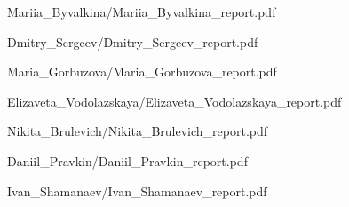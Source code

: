 \documentclass[a4paper]{article}
\begin{document}
{Mariia_Byvalkina/Mariia_Byvalkina_report.pdf}

{Dmitry_Sergeev/Dmitry_Sergeev_report.pdf}

{Maria_Gorbuzova/Maria_Gorbuzova_report.pdf}

{Elizaveta_Vodolazskaya/Elizaveta_Vodolazskaya_report.pdf}

{Nikita_Brulevich/Nikita_Brulevich_report.pdf}

{Daniil_Pravkin/Daniil_Pravkin_report.pdf}

{Ivan_Shamanaev/Ivan_Shamanaev_report.pdf}
\end{document}
